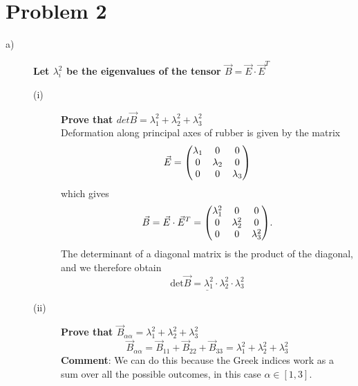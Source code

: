 \documentclass[norsk,a4paper,12pt]{article}
\begin{document}
\section*{Problem 2}
\begin{description}
\item [a)] \textbf{Let $\lambda_i^2$ be the eigenvalues of the tensor $\vec{B}=\vec{E}\cdot \vec{E}^T$}
\begin{description}
\item[(i)] \textbf{Prove that $det\vec{B}=\lambda_1^2+\lambda_2^2+\lambda_3^2$}\\
Deformation along principal axes of rubber is given by the matrix
$$\vec{E}=\mqty(\lambda_1&0&0\\0&\lambda_2&0\\0&0&\lambda_3)$$
which gives
$$\vec{B}=\vec{E}\cdot\vec{E}^T=\mqty(\lambda_1^2&0&0\\0&\lambda_2^2&0\\0&0&\lambda_3^2).$$
The determinant of a diagonal matrix is the product of the diagonal, and we therefore obtain
\begin{equation}
\underline{\text{det}\vec{B}=\lambda_1^2\cdot\lambda_2^2\cdot\lambda_3^2}
\end{equation}
\item[(ii)]\textbf{Prove that $\vec{B}_{\alpha\alpha}=\lambda_1^2+\lambda_2^2+\lambda_3^2$}
$$\vec{B}_{\alpha\alpha}=\vec{B}_{11}+\vec{B}_{22}+\vec{B}_{33}=\lambda_1^2+\lambda_2^2+\lambda_3^2$$
\textbf{Comment}: We can do this because the Greek indices work as a sum over all the possible outcomes, in this case $\alpha\in[1,3]$.
\end{description}


\end{description}
\end{document}
